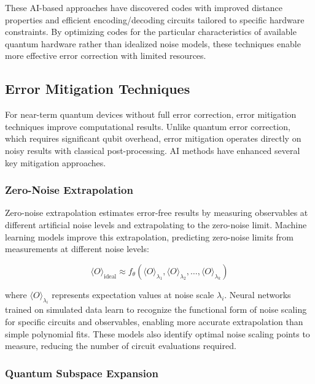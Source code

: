 These AI-based approaches have discovered codes with improved distance properties and efficient encoding/decoding circuits tailored to specific hardware constraints. By optimizing codes for the particular characteristics of available quantum hardware rather than idealized noise models, these techniques enable more effective error correction with limited resources.

\subsection{Error Mitigation Techniques}

For near-term quantum devices without full error correction, error mitigation techniques improve computational results. Unlike quantum error correction, which requires significant qubit overhead, error mitigation operates directly on noisy results with classical post-processing. AI methods have enhanced several key mitigation approaches.

\subsubsection{Zero-Noise Extrapolation}

Zero-noise extrapolation estimates error-free results by measuring observables at different artificial noise levels and extrapolating to the zero-noise limit. Machine learning models improve this extrapolation, predicting zero-noise limits from measurements at different noise levels:

\begin{equation}
\langle O \rangle_{\text{ideal}} \approx f_\theta(\langle O \rangle_{\lambda_1}, \langle O \rangle_{\lambda_2}, \ldots, \langle O \rangle_{\lambda_k})
\end{equation}

where $\langle O \rangle_{\lambda_i}$ represents expectation values at noise scale $\lambda_i$. Neural networks trained on simulated data learn to recognize the functional form of noise scaling for specific circuits and observables, enabling more accurate extrapolation than simple polynomial fits. These models also identify optimal noise scaling points to measure, reducing the number of circuit evaluations required.

\subsubsection{Quantum Subspace Expansion}

